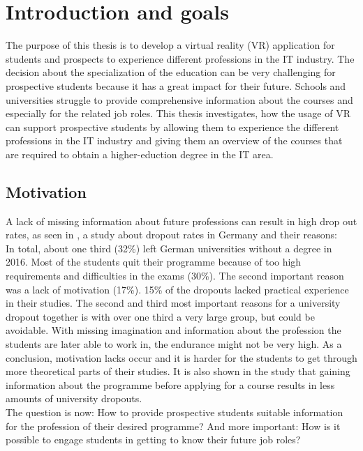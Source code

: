 \chapter{Introduction and goals}
The purpose of this thesis is to develop a virtual reality (VR) application for students and prospects to experience different professions in the IT industry. 
The decision about the specialization of the education can be very challenging for prospective students because it has a great impact for their future. Schools and universities struggle to provide comprehensive information about the courses and especially for the related job roles. This thesis investigates, how the usage of VR can support prospective students  by allowing them to experience the different professions in the IT industry and giving them an overview of the courses that are required to obtain a higher-eduction degree in the IT area.






\section{Motivation}
A lack of missing information about future professions can result in high drop out rates, as seen in \cite{UlrichHeublein.Juni2017}, a study about dropout rates in Germany and their reasons: \\ In total, about one third (32\%) left German universities without a degree in 2016. Most of the students quit their programme because of too high requirements and difficulties in the exams (30\%). The second important reason was a lack of motivation (17\%).  15\% of the dropouts lacked practical experience in their studies.
The second and third most important reasons for a university dropout together is with over one third a very large group, but could be avoidable. With missing imagination and information about the profession the students are later able to work in, the endurance might not be very high. As a conclusion, motivation lacks occur and it is harder for the students to get through more theoretical parts of their studies. It is also shown in the study that gaining information about the programme before applying for a course results in less amounts of university dropouts. \\
The question is now: How to provide prospective students suitable information for the profession of their desired programme? And more important: How is it possible to engage students in getting to know their future job roles?
